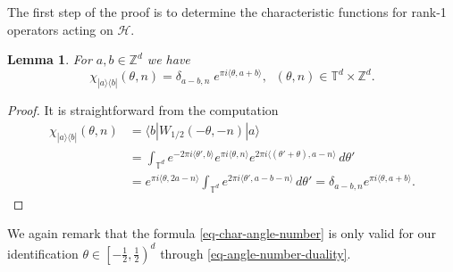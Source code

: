 \documentclass[12pt,reqno]{amsart}
\newtheorem{lem}[thm]{Lemma}
\theoremstyle{definition}
\theoremstyle{definition}
\theoremstyle{definition}
\numberwithin{thm}{section}
\numberwithin{equation}{section}
\newcommand{\la}{\langle}
\newcommand{\ra}{\rangle}
\newcommand{\Hi}{\mathcal{H}}
\newcommand{\tor}{\mathbb{T}}
\newcommand{\z}{\mathbb{Z}}
\begin{document}
The first step of the proof is to determine the characteristic functions for rank-1 operators acting on $\Hi$.


\begin{lem}\label{lem-char-ft-angle-number}
For $a,b\in \z^d$ we have 
\begin{equation} \label{eq-char-angle-number}
    \chi_{|a\ra \la b|}(\theta, n)=\delta_{a-b, n}\;e^{\pi i \la \theta, a+b\ra},\;\; (\theta,n)\in \tor^d\times \z^d.
\end{equation}
\end{lem}
\begin{proof}
It is straightforward from the computation
\begin{align*}
    \chi_{|a\ra\la b|}(\theta,n)&=\la b|W_{1/2}(-\theta,-n)|a\ra\\
    &=\int_{\tor^d} e^{-2\pi i \la \theta',b \ra}e^{\pi i \la \theta, n\ra} e^{2\pi i \la(\theta'+\theta),a-n\ra}\,d\theta'\\
    &=e^{\pi i \la \theta, 2a-n\ra}\int_{\tor^d} e^{2\pi i \la \theta',a-b-n \ra}\,d\theta' =\delta_{a-b,n}e^{\pi i \la \theta, a+b\ra}.
\end{align*}

\end{proof}
We again remark that the formula \eqref{eq-char-angle-number} is only valid for our identification $\theta\in \left[-\frac{1}{2},\frac{1}{2} \right)^d$ through \eqref{eq-angle-number-duality}.
\end{document}
